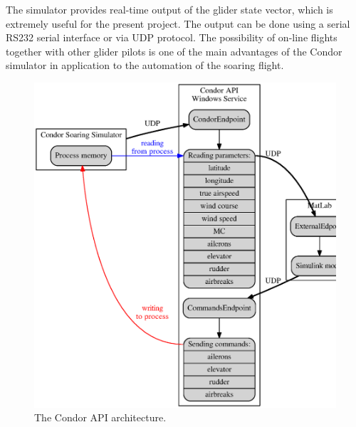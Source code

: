 \documentclass[letterpaper, 10 pt, conference]{ieeeconf}  %
\begin{document}
The simulator provides real-time output of the glider state vector, which is extremely useful for the present project. The output can be done using a serial RS232 serial interface or via UDP protocol. The possibility of on-line flights together with other glider pilots is one of the main advantages of the Condor simulator in application to the automation of the soaring flight.
\begin{figure}[thpb]
  \centering
  \includegraphics[scale=0.35]{Figures/api_arch.eps}
  \caption{The Condor API architecture.}
  \label{fig:api_arch}
\end{figure}
\end{document}
